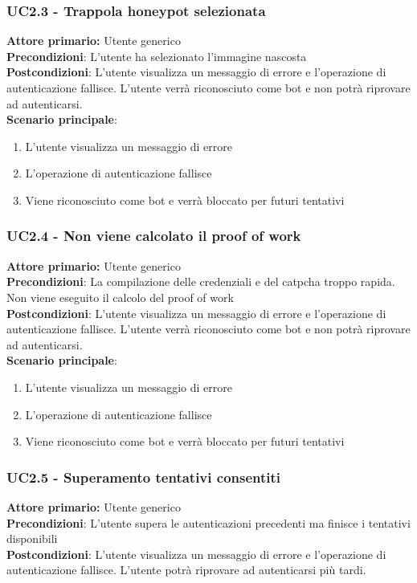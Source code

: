 \subsubsection{UC2.3 - Trappola honeypot selezionata}
\textbf{Attore primario:} Utente generico\\
\textbf{Precondizioni}: L’utente ha selezionato l'immagine nascosta\\
\textbf{Postcondizioni}:  L’utente visualizza un messaggio di errore e l’operazione di autenticazione fallisce. L’utente verrà riconosciuto come bot e non potrà riprovare  ad autenticarsi.\\

\textbf{Scenario principale}:
\begin{enumerate}
	\item L’utente visualizza un messaggio di errore
	\item L’operazione di autenticazione fallisce
	\item Viene riconosciuto come bot e verrà bloccato per futuri tentativi
\end{enumerate}

\subsubsection{UC2.4 - Non viene calcolato il proof of work}
\textbf{Attore primario:} Utente generico\\
\textbf{Precondizioni}: La compilazione delle credenziali e del catpcha troppo rapida. Non viene eseguito il calcolo del proof of work\\
\textbf{Postcondizioni}:  L’utente visualizza un messaggio di errore e l’operazione di autenticazione fallisce. L’utente verrà riconosciuto come bot e non potrà riprovare  ad autenticarsi.\\

\textbf{Scenario principale}:
\begin{enumerate}
	\item L’utente visualizza un messaggio di errore
	\item L’operazione di autenticazione fallisce
	\item Viene riconosciuto come bot e verrà bloccato per futuri tentativi
\end{enumerate}

\subsubsection{UC2.5 - Superamento tentativi consentiti}
\textbf{Attore primario:} Utente generico\\
\textbf{Precondizioni}: L'utente supera le autenticazioni precedenti ma finisce i tentativi disponibili\\
\textbf{Postcondizioni}:  L’utente visualizza un messaggio di errore e l’operazione di autenticazione fallisce. L’utente potrà riprovare ad autenticarsi più tardi.\\

